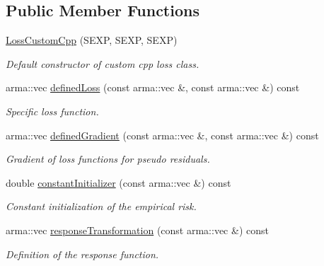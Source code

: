 \subsection*{Public Member Functions}
\begin{DoxyCompactItemize}
\item 
\hyperlink{classloss_1_1_loss_custom_cpp_a4393e1067c97d6cc1200c7a4659f1f13}{Loss\+Custom\+Cpp} (S\+E\+XP, S\+E\+XP, S\+E\+XP)
\begin{DoxyCompactList}\small\item\em Default constructor of custom cpp loss class. \end{DoxyCompactList}\item 
arma\+::vec \hyperlink{classloss_1_1_loss_custom_cpp_abb0c51701c90ce115cd0a0440e5b28f8}{defined\+Loss} (const arma\+::vec \&, const arma\+::vec \&) const
\begin{DoxyCompactList}\small\item\em Specific loss function. \end{DoxyCompactList}\item 
arma\+::vec \hyperlink{classloss_1_1_loss_custom_cpp_a8db4924e9a9866c00adf4a8cfd3ec38a}{defined\+Gradient} (const arma\+::vec \&, const arma\+::vec \&) const
\begin{DoxyCompactList}\small\item\em Gradient of loss functions for pseudo residuals. \end{DoxyCompactList}\item 
double \hyperlink{classloss_1_1_loss_custom_cpp_af6d7652231c313abe11009e44b51d0b1}{constant\+Initializer} (const arma\+::vec \&) const
\begin{DoxyCompactList}\small\item\em Constant initialization of the empirical risk. \end{DoxyCompactList}\item 
arma\+::vec \hyperlink{classloss_1_1_loss_custom_cpp_ace7a23f6b0da58d12f1dec29e26acf18}{response\+Transformation} (const arma\+::vec \&) const
\begin{DoxyCompactList}\small\item\em Definition of the response function. \end{DoxyCompactList}\end{DoxyCompactItemize}
